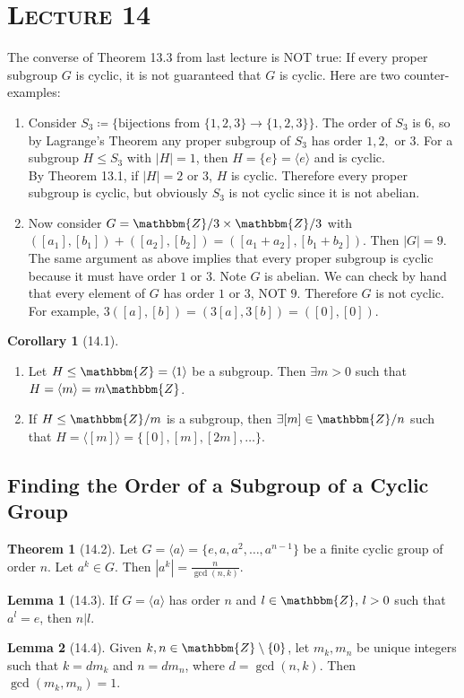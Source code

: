 \documentclass{article}
\newcommand{\Z}{\mathbbm{Z}}
\newcommand{\coleq}{\coloneqq}
\theoremstyle{definition}
\newtheorem*{cor}{Corollary}
\newtheorem*{thm}{Theorem}
\newtheorem*{lem}{Lemma}
\theoremstyle{remark}
\newcommand{\cyc}[1]{\langle#1\rangle}
\begin{document}
    \section*{\textbf{\textsc{Lecture 14}}}{
        The converse of Theorem 13.3 from last lecture is NOT true: If every proper subgroup $G$ is cyclic, it is not guaranteed that $G$ is cyclic. Here are two counter-examples:
        \begin{enumerate}
            \item Consider $S_3\coleq \{\text{bijections from }\{1,2,3\}\to \{1,2,3\}\}$. The order of $S_3$ is $6$, so by Lagrange's Theorem any proper subgroup of $S_3$ has order $1,2,$ or $3$. For a subgroup $H \leq S_3$ with $|H|=1$, then $H=\{e\}=\cyc{e}$ and is cyclic.\\
            By Theorem 13.1, if $|H|=2$ or $3$, $H$ is cyclic. Therefore every proper subgroup is cyclic, but obviously $S_3$ is not cyclic since it is not abelian.
            \item Now consider $G=\Z/3\times \Z/3$ with $([a_1],[b_1])+([a_2],[b_2])=([a_1+a_2],[b_1+b_2])$. Then $|G|=9$. The same argument as above implies that every proper subgroup is cyclic because it must have order $1$ or $3$. Note $G$ is abelian. We can check by hand that every element of $G$ has order $1$ or $3$, NOT $9$. Therefore $G$ is not cyclic. For example, $3([a],[b])=(3[a],3[b])=([0],[0])$.
        \end{enumerate}
        
        \begin{cor}[14.1]\hfill
            \begin{enumerate}
                \item Let $H\leq \Z=\cyc{1}$ be a subgroup. Then $\exists m>0$ such that $H=\cyc{m}=m\Z$.
                \item If $H\leq \Z/m$ is a subgroup, then $\exists[m] \in \Z/n$ such that $H=\cyc{[m]}=\{[0],[m],[2m],\ldots\}$.
            \end{enumerate}
        \end{cor}
        
        \subsection*{Finding the Order of a Subgroup of a Cyclic Group}{
            \begin{thm}[14.2]
                Let $G=\cyc{a}=\{e,a,a^2,\ldots,a^{n-1}\}$ be a finite cyclic group of order $n$. Let $a^k\in G$. Then $|a^k|=\frac{n}{\gcd(n,k)}$.
            \end{thm}
            
            \begin{lem}[14.3]
                If $G=\cyc{a}$ has order $n$ and $l \in \Z, \, l>0$ such that $a^l=e$, then $n|l$.
            \end{lem}
            
            \begin{lem}[14.4]
                Given $k,n \in \Z\setminus\{0\}$, let $m_k,m_n$ be unique integers such that $k=dm_k$ and $n=dm_n$, where $d=\gcd(n,k)$. Then $\gcd(m_k,m_n)=1$.
            \end{lem}
        }
    }
    
\end{document}
